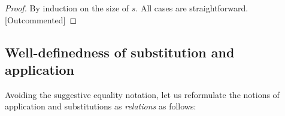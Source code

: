 \documentclass{lmcs}
\theoremstyle{theorem}\newtheorem{theorem}[dummy]{Theorem}
\theoremstyle{theorem}\newtheorem{lemma}[dummy]{Lemma}
\theoremstyle{theorem}\newtheorem{corollary}[dummy]{Corollary}
\theoremstyle{definition}\newtheorem{definition}[dummy]{Definition}
\theoremstyle{definition}\newtheorem{example}[dummy]{Example}
\newcommand{\FV}{\mathit{FV}}
\newcommand{\identifier}[1]{\mathtt{#1}}
\newcommand{\afun}{\identifier{f}}
\newcommand{\abs}[2]{\lambda #1.#2}
\begin{document}
\begin{proof}
By induction on the size of $s$.
All cases are straightforward. [Outcommented]
\end{proof}

\subsection{Well-definedness of substitution and application}

Avoiding the suggestive equality notation, let us reformulate the notions of application and substitutions as \emph{relations} as follows:
\end{document}
